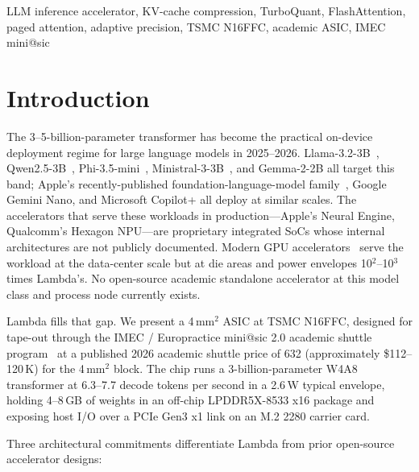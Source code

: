 \documentclass[conference]{IEEEtran}
\begin{document}
\begin{IEEEkeywords}
LLM inference accelerator, KV-cache compression, TurboQuant, FlashAttention, paged attention, adaptive precision, TSMC N16FFC, academic ASIC, IMEC mini@sic
\end{IEEEkeywords}

\section{Introduction}

The 3--5-billion-parameter transformer has become the practical on-device deployment regime for large language models in 2025--2026. Llama-3.2-3B~\cite{llama3}, Qwen2.5-3B~\cite{qwen25}, Phi-3.5-mini~\cite{phi35}, Ministral-3-3B~\cite{ministral3}, and Gemma-2-2B all target this band; Apple's recently-published foundation-language-model family~\cite{apple_foundation}, Google Gemini Nano, and Microsoft Copilot+ all deploy at similar scales. The accelerators that serve these workloads in production---Apple's Neural Engine, Qualcomm's Hexagon NPU---are proprietary integrated SoCs whose internal architectures are not publicly documented. Modern GPU accelerators~\cite{nvidia_ampere,nvidia_hopper,nvidia_blackwell} serve the workload at the data-center scale but at die areas and power envelopes 10$^2$--10$^3$ times Lambda's. No open-source academic standalone accelerator at this model class and process node currently exists.

Lambda fills that gap. We present a 4\,mm$^2$ ASIC at TSMC N16FFC, designed for tape-out through the IMEC / Europractice mini@sic 2.0 academic shuttle program~\cite{imec_minisic} at a published 2026 academic shuttle price of 632 (approximately \$112--120\,K) for the 4\,mm$^2$ block. The chip runs a 3-billion-parameter W4A8 transformer at 6.3--7.7 decode tokens per second in a 2.6\,W typical envelope, holding 4--8\,GB of weights in an off-chip LPDDR5X-8533 x16 package and exposing host I/O over a PCIe Gen3 x1 link on an M.2 2280 carrier card.

Three architectural commitments differentiate Lambda from prior open-source accelerator designs:
\end{document}
